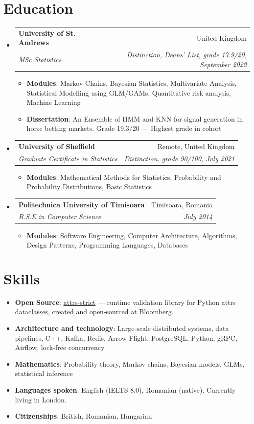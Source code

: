 \documentclass[letterpaper,11pt]{article}
\makeatletter
\newcommand{\resumeItem}[2]{
  \item\small{
    \textbf{#1}{: #2 \vspace{-1pt}}
  }
}
\newcommand{\resumeSubheading}[4]{
  \vspace{-1pt}\item
    \begin{tabular*}{0.97\textwidth}{l@{\extracolsep{\fill}}r}
      \textbf{#1} & #2 \\
      \textit{\small#3} & \textit{\small #4} \\
    \end{tabular*}\vspace{-5pt}
}
\newcommand{\resumeSubHeadingListStart}{\begin{itemize}[leftmargin=*]}
\newcommand{\resumeSubHeadingListEnd}{\end{itemize}}
\newcommand{\resumeItemListStart}{\begin{itemize}}
\newcommand{\resumeItemListEnd}{\end{itemize}\vspace{-4.6pt}}
\makeatother
\begin{document}
\section{Education}
  \resumeSubHeadingListStart
    \resumeSubheading
      {University of St. Andrews}{United Kingdom}
      {MSc Statistics} {Distinction, Deans' List, grade 17.9/20, September 2022}
    \resumeItemListStart
    	\resumeItem{Modules}
        {Markov Chains, Bayesian Statistics, Multivariate Analysis, Statistical Modelling using GLM/GAMs, Quantitative risk analysis, Machine Learning}
      \resumeItem{Dissertation}
        {An Ensemble of HMM and KNN for signal generation in horse betting markets. Grade 19.3/20 --- Highest grade in cohort}
    \resumeItemListEnd
    \resumeSubheading
      {University of Sheffield}{Remote, United Kingdom}
      {Graduate Certificate in Statistics}{Distinction, grade 90/100, July 2021}
    \resumeItemListStart
    	\resumeItem{Modules}
        {Mathematical Methods for Statistics, Probability and Probability Distributions, Basic Statistics}
    \resumeItemListEnd
    \resumeSubheading
      {Politechnica University of Timisoara}{Timisoara, Romania}
      {B.S.E in Computer Science}{July 2014}
    \resumeItemListStart
    	\resumeItem{Modules}
        {Software Engineering, Computer Architecture, Algorithms, Design Patterns, Programming Languages, Databases}
    \resumeItemListEnd
  \resumeSubHeadingListEnd

\section{Skills}
 \resumeSubHeadingListStart
   \item{
     \textbf{Open Source}{: \href{https://github.com/bloomberg/attrs-strict}{attrs-strict} --- runtime validation library for Python attrs dataclasses, created and open-sourced at Bloomberg.}
   }
   \item{
     \textbf{Architecture and technology}{: Large-scale distributed systems, data pipelines, C++, Kafka, Redis, Arrow Flight, PostgreSQL, Python, gRPC, Airflow, lock-free concurrency}
   }
   \item{
     \textbf{Mathematics}{: Probability theory, Markov chains, Bayesian models, GLMs, statistical inference}
   }
   \item{
     \textbf{Languages spoken}{: English (IELTS 8.0), Romanian (native). Currently living in London.}
   }
  \item{
    \textbf{Citizenships}{: British, Romanian, Hungarian}
  }
 \resumeSubHeadingListEnd
\end{document}
